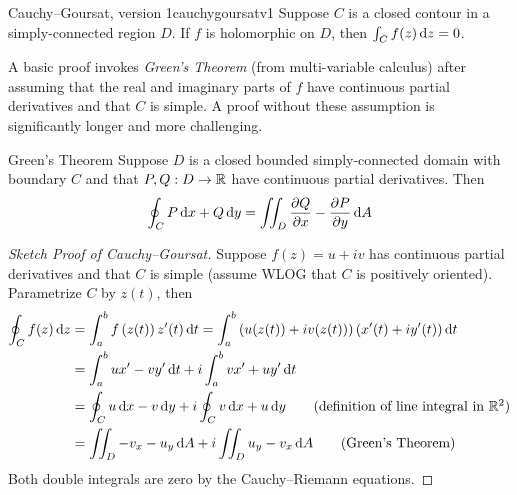 \begin{thm}{Cauchy--Goursat, version 1}{cauchygoursatv1}
	Suppose $C$ is a closed contour in a simply-connected region $D$. If $f$ is holomorphic on $D$, then $\int_Cf(z)\,\dz=0$.
\end{thm}

A basic proof invokes \emph{Green's Theorem} (from multi-variable calculus) after assuming that the real and imaginary parts of $f$ have continuous partial derivatives and that $C$ is simple. A proof without these assumption is significantly longer and more challenging.

\begin{lemm}{Green's Theorem}{}
	Suppose $D$ is a closed bounded simply-connected domain with boundary $C$ and that $P,Q:D\to\R$ have continuous partial derivatives. Then
	\[
		\oint_CP\,\dx+Q\,\dy=\iint_D\partials[Q]{x}-\partials[P]{y}\,\dA
	\] 
\end{lemm}

\begin{proof}[Sketch Proof of Cauchy--Goursat]
	Suppose $f(z)=u+iv$ has continuous partial derivatives and that $C$ is simple (assume WLOG that $C$ is positively oriented). Parametrize $C$ by $z(t)$, then
	\begin{align*}
		\oint_Cf(z)\,\dz&=\int_a^bf\left(z(t)\right)z'(t)\,\dt =\int_a^b\left(u(z(t))+iv(z(t))\right)\left(x'(t)+iy'(t)\right)\dt\\
		&=\int_a^bux'-vy'\,\dt+i\int_a^bvx'+uy'\,\dt\\
		&=\oint_Cu\,\dx-v\,\dy+i\oint_Cv\,\dx+u\,\dy \tag{definition of line integral in $\R^2$}\\
		&=\iint_D-v_x-u_y\,\dA+i\iint_Du_y-v_x\,\dA \tag{Green's Theorem}
	\end{align*}
	Both double integrals are zero by the Cauchy--Riemann equations. 
\end{proof}

